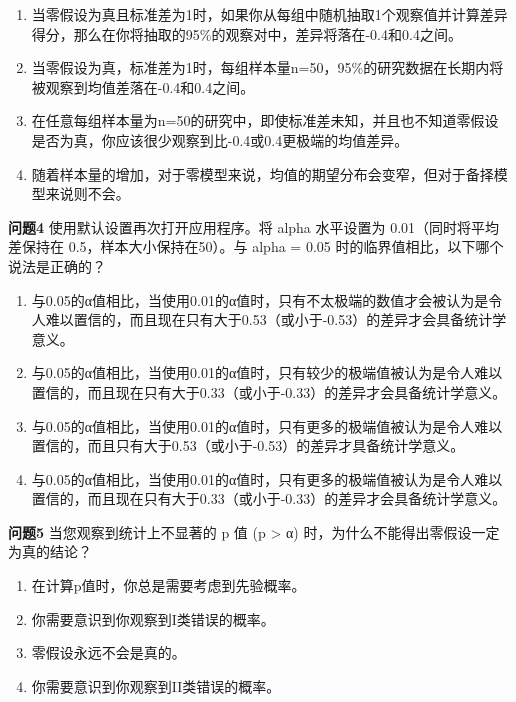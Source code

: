 \documentclass[
  letterpaper,
  DIV=11,
  numbers=noendperiod]{scrreprt}
\providecommand{\tightlist}{%
  \setlength{\itemsep}{0pt}\setlength{\parskip}{0pt}}\usepackage{longtable,booktabs,array}
\begin{document}
\begin{enumerate}
\def\labelenumi{\Alph{enumi})}
\tightlist
\item
  当零假设为真且标准差为1时，如果你从每组中随机抽取1个观察值并计算差异得分，那么在你将抽取的95\%的观察对中，差异将落在-0.4和0.4之间。
\item
  当零假设为真，标准差为1时，每组样本量n=50，95\%的研究数据在长期内将被观察到均值差落在-0.4和0.4之间。
\item
  在任意每组样本量为n=50的研究中，即使标准差未知，并且也不知道零假设是否为真，你应该很少观察到比-0.4或0.4更极端的均值差异。
\item
  随着样本量的增加，对于零模型来说，均值的期望分布会变窄，但对于备择模型来说则不会。
\end{enumerate}

\textbf{问题4} 使用默认设置再次打开应用程序。将 alpha 水平设置为
0.01（同时将平均差保持在 0.5，样本大小保持在50）。与 alpha = 0.05
时的临界值相比，以下哪个说法是正确的？

\begin{enumerate}
\def\labelenumi{\Alph{enumi})}
\tightlist
\item
  与0.05的α值相比，当使用0.01的α值时，只有不太极端的数值才会被认为是令人难以置信的，而且现在只有大于0.53（或小于-0.53）的差异才会具备统计学意义。
\item
  与0.05的α值相比，当使用0.01的α值时，只有较少的极端值被认为是令人难以置信的，而且现在只有大于0.33（或小于-0.33）的差异才会具备统计学意义。
\item
  与0.05的α值相比，当使用0.01的α值时，只有更多的极端值被认为是令人难以置信的，而且只有大于0.53（或小于-0.53）的差异才具备统计学意义。
\item
  与0.05的α值相比，当使用0.01的α值时，只有更多的极端值被认为是令人难以置信的，而且现在只有大于0.33（或小于-0.33）的差异才会具备统计学意义。
\end{enumerate}

\textbf{问题5} 当您观察到统计上不显著的 p 值 (p \textgreater{} α)
时，为什么不能得出零假设一定为真的结论？

\begin{enumerate}
\def\labelenumi{\Alph{enumi})}
\tightlist
\item
  在计算p值时，你总是需要考虑到先验概率。
\item
  你需要意识到你观察到I类错误的概率。
\item
  零假设永远不会是真的。
\item
  你需要意识到你观察到II类错误的概率。
\end{enumerate}
\end{document}

